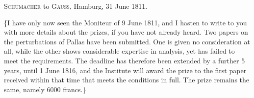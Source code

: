 \par{}\bigskip
\begin{center}
\textsc{Schumacher} to \textsc{Gauss}, Hamburg, 31 June 1811.
\end{center}
\noindent\hspace*{\parindent}\{I have only now seen the Moniteur of 9 June 1811, and I hasten to write to you with more details about the prizes, if you have not already heard. Two papers on the perturbations of Pallas have been submitted. One is given no consideration at all, while the other shows considerable expertise in analysis, yet has failed to meet the requirements. The deadline has therefore been extended by a further 5 years, until 1 June 1816, and the Institute will award the prize to the first paper received within that time that meets the conditions in full. The prize remains the same, namely 6000 francs.\}
\par
